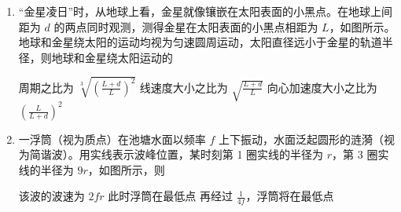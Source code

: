 \documentclass[\gkver]{gaokaozhenti}
\begin{document}
\begin{enumerate}
{故选 C。
}

\item
“金星凌日”时，从地球上看，金星就像镶嵌在太阳表面的小黑点。在地球上间距为 $d$ 的两点同时观测，测得金星在太阳表面的小黑点相距为 $L$，如图所示。地球和金星绕太阳的运动均视为匀速圆周运动，太阳直径远小于金星的轨道半径，则地球和金星绕太阳运动的

\onepicture[h=4.60cm]{}

{周期之比为 $\sqrt[3]{\left(\frac{L+d}{L}\right)^{2}}$}
{线速度大小之比为 $\sqrt{\frac{L+d}{L}}$}
{向心加速度大小之比为 $\left(\frac{L}{L+d}\right)^{2}$}


\item
一浮筒（视为质点）在池塘水面以频率 $f$ 上下振动，水面泛起圆形的涟漪（视为简谐波）。用实线表示波峰位置，某时刻第 1 圈实线的半径为 $r$，第 3 圈实线的半径为 $9r$，如图所示，则

\onepicture[w=4.60cm]{}

{该波的波速为 $2fr$}
{此时浮筒在最低点}
{再经过 $\frac{1}{4f}$，浮筒将在最低点}


\end{enumerate}
\end{document}
